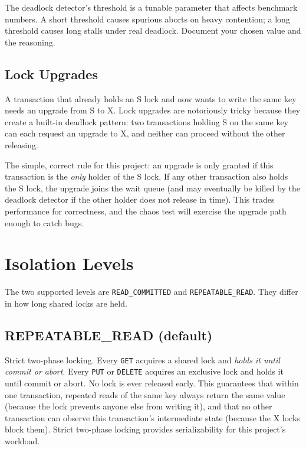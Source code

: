 \documentclass[11pt,a4paper]{article}
\begin{document}
The deadlock detector's threshold is a tunable parameter that affects benchmark numbers. A short threshold causes spurious aborts on heavy contention; a long threshold causes long stalls under real deadlock. Document your chosen value and the reasoning.

\subsection{Lock Upgrades}
A transaction that already holds an S lock and now wants to write the same key needs an upgrade from S to X. Lock upgrades are notoriously tricky because they create a built-in deadlock pattern: two transactions holding S on the same key can each request an upgrade to X, and neither can proceed without the other releasing.

The simple, correct rule for this project: an upgrade is only granted if this transaction is the \textit{only} holder of the S lock. If any other transaction also holds the S lock, the upgrade joins the wait queue (and may eventually be killed by the deadlock detector if the other holder does not release in time). This trades performance for correctness, and the chaos test will exercise the upgrade path enough to catch bugs.

\section{Isolation Levels}

The two supported levels are \texttt{READ\_COMMITTED} and \texttt{REPEATABLE\_READ}. They differ in how long shared locks are held.

\subsection{REPEATABLE\_READ (default)}
Strict two-phase locking. Every \texttt{GET} acquires a shared lock and \textit{holds it until commit or abort}. Every \texttt{PUT} or \texttt{DELETE} acquires an exclusive lock and holds it until commit or abort. No lock is ever released early. This guarantees that within one transaction, repeated reads of the same key always return the same value (because the lock prevents anyone else from writing it), and that no other transaction can observe this transaction's intermediate state (because the X locks block them). Strict two-phase locking provides serializability for this project's workload.
\end{document}
